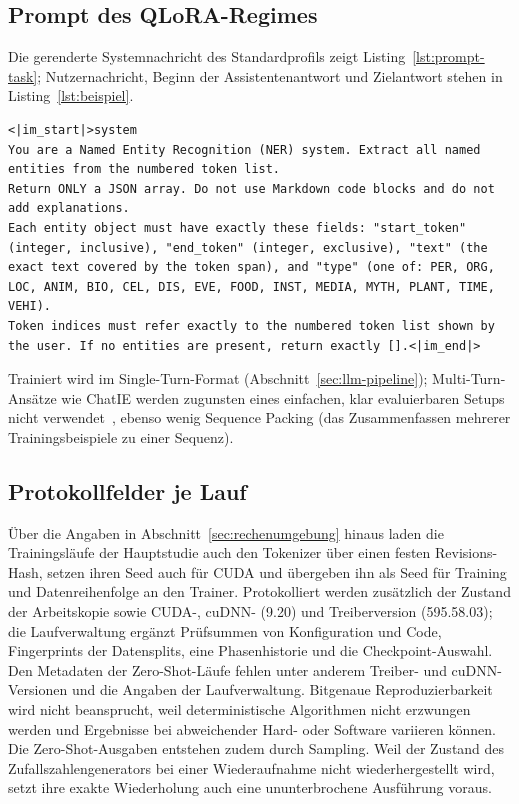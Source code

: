 \subsection{Prompt des QLoRA-Regimes}
\label{app:prompt}

Die gerenderte Systemnachricht des Standardprofils zeigt
Listing~\ref{lst:prompt-task}; Nutzernachricht, Beginn der
Assistentenantwort und Zielantwort stehen in
Listing~\ref{lst:beispiel}.

\begin{lstlisting}[basicstyle=\ttfamily\scriptsize, breaklines=true,
  breakatwhitespace=true, columns=fullflexible, keepspaces=true,
  frame=single, captionpos=b, float=htbp,
  postbreak=\mbox{\textcolor{gray}{$\hookrightarrow$}\space},
  caption={Gerenderte Systemnachricht des Standardprofils
  (Chat-Template von Qwen3.5); automatische Zeilenumbrüche sind durch
  einen Pfeil markiert.},
  label={lst:prompt-task}]
<|im_start|>system
You are a Named Entity Recognition (NER) system. Extract all named entities from the numbered token list.
Return ONLY a JSON array. Do not use Markdown code blocks and do not add explanations.
Each entity object must have exactly these fields: "start_token" (integer, inclusive), "end_token" (integer, exclusive), "text" (the exact text covered by the token span), and "type" (one of: PER, ORG, LOC, ANIM, BIO, CEL, DIS, EVE, FOOD, INST, MEDIA, MYTH, PLANT, TIME, VEHI).
Token indices must refer exactly to the numbered token list shown by the user. If no entities are present, return exactly [].<|im_end|>
\end{lstlisting}

\noindent Trainiert wird im Single-Turn-Format
(Abschnitt~\ref{sec:llm-pipeline}); Multi-Turn-Ansätze wie ChatIE werden
zugunsten eines einfachen, klar evaluierbaren Setups nicht
verwendet~\cite{wei2023chatie}, ebenso wenig Sequence Packing
(das Zusammenfassen mehrerer Trainingsbeispiele zu einer Sequenz).


\subsection{Protokollfelder je Lauf}
\label{app:protokoll}

Über die Angaben in Abschnitt~\ref{sec:rechenumgebung} hinaus laden die
Trainingsläufe der Hauptstudie auch den Tokenizer über einen festen
Revisions-Hash, setzen ihren Seed auch für CUDA und übergeben ihn als
Seed für Training und Datenreihenfolge an den Trainer.
Protokolliert werden zusätzlich der Zustand der Arbeitskopie sowie
CUDA-, cuDNN- (9.20) und Treiberversion (595.58.03); die Laufverwaltung
ergänzt Prüfsummen von Konfiguration und Code, Fingerprints der
Datensplits, eine Phasenhistorie und die Checkpoint-Auswahl.
Den Metadaten der Zero-Shot-Läufe fehlen unter anderem Treiber- und
cuDNN-Versionen und die Angaben der Laufverwaltung.
Bitgenaue Reproduzierbarkeit wird nicht beansprucht, weil
deterministische Algorithmen nicht erzwungen werden und Ergebnisse bei
abweichender Hard- oder Software variieren können.
Die Zero-Shot-Ausgaben entstehen zudem durch Sampling.
Weil der Zustand des Zufallszahlengenerators bei einer Wiederaufnahme
nicht wiederhergestellt wird, setzt ihre exakte Wiederholung auch eine
ununterbrochene Ausführung voraus.

